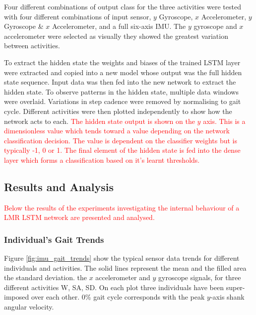 \documentclass[sensors,article,submit,moreauthors,pdftex]{Definitions/mdpi}
\begin{document}
Four different combinations of output class for the three activities were tested with four different combinations of input sensor, $y$ Gyroscope, $x$ Accelerometer, $y$ Gyroscope \& $x$ Accelerometer, and a full six-axis IMU. The $y$ gyroscope and $x$ accelerometer were selected as visually they showed the greatest variation between activities.

To extract the hidden state the weights and biases of the trained LSTM layer were extracted and copied into a new model whose output was the full hidden state sequence. Input data was then fed into the new network to extract the hidden state. To observe patterns in the hidden state, multiple data windows were overlaid. Variations in step cadence were removed by normalising to gait cycle. Different activities were then plotted independently to show how the network acts to each. \textcolor{red}{The hidden state output is shown on the $y$ axis. This is a dimensionless value which tends toward a value depending on the network classification decision. The value is dependent on the classifier weights but is typically -1, 0 or 1.  The final element of the hidden state is fed into the dense layer which forms a classification based on it's learnt thresholds.}


\subsection{Results and Analysis}
\textcolor{red}{Below the results of the experiments investigating the internal behaviour of a LMR LSTM network are presented and analysed.}

\subsubsection{Individual's Gait Trends}
Figure \ref{fig:imu_gait_trends} show the typical sensor data trends for different individuals and activities. The solid lines represent the mean and the filled area the standard deviation. the $x$ accelerometer and $y$ gyroscope signals, for three different activities W, SA, SD. On each plot three individuals have been super-imposed over each other. 0\% gait cycle corresponds with the peak $y$-axis shank angular velocity.
\end{document}
